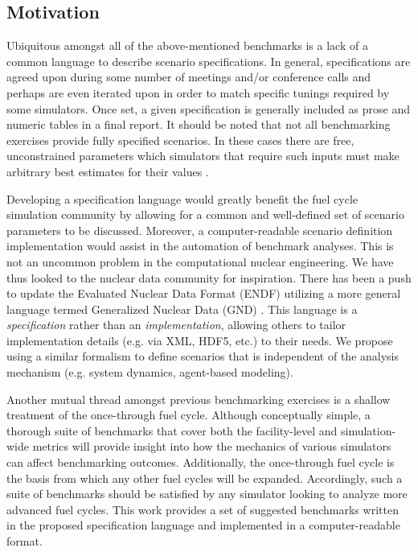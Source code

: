 \documentclass{anstrans}
\begin{document}
\subsection{Motivation}
Ubiquitous amongst all of the above-mentioned benchmarks is a lack of a common
language to describe scenario specifications. In general, specifications are
agreed upon during some number of meetings and/or conference calls and perhaps
are even iterated upon in order to match specific tunings required by some
simulators. Once set, a given specification is generally included as prose and
numeric tables in a final report. It should be noted that not all benchmarking
exercises provide fully specified scenarios. In these cases there are free, 
unconstrained parameters which simulators that require such inputs must make
arbitrary best estimates for their values \cite{scopatz_fuel_2011}.

Developing a specification language would greatly benefit the fuel cycle
simulation community by allowing for a common and well-defined 
set of scenario parameters to be discussed. Moreover, a computer-readable
scenario definition implementation would assist in the automation of benchmark
analyses. This is not an uncommon problem in the computational nuclear
engineering. We have thus looked to the nuclear data community for inspiration. 
There has
been a push to update the Evaluated Nuclear Data Format (ENDF) utilizing a more
general language termed Generalized Nuclear Data (GND)
\cite{mattoon_generalized_2012}. This language is a \emph{specification} rather
than an \emph{implementation}, allowing others to tailor implementation details
(e.g. via XML, HDF5, etc.) to their needs. We propose using a similar formalism
to define scenarios that is independent of the analysis mechanism (e.g. system
dynamics, agent-based modeling).

Another mutual thread amongst previous benchmarking exercises is a shallow
treatment of the once-through fuel cycle. Although conceptually simple, a
thorough suite of benchmarks that cover both the facility-level and
simulation-wide metrics will provide insight into how the mechanics of various
simulators can affect benchmarking outcomes. Additionally, the once-through fuel
cycle is the basis from which any other fuel cycles will be expanded.
Accordingly, such a suite of benchmarks should be satisfied by any simulator
looking to analyze more advanced fuel cycles. This work provides a set of
suggested benchmarks written in the proposed specification language and
implemented in a computer-readable format.
\end{document}
